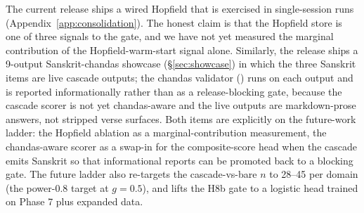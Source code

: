 The current release ships a wired Hopfield  that is exercised in single-session runs (Appendix~\ref{app:consolidation}). The honest claim is that the Hopfield store is one of three signals to the  gate, and we have not yet measured the marginal contribution of the Hopfield-warm-start signal alone. Similarly, the release ships a 9-output Sanskrit-chandas showcase (\S\ref{sec:showcase}) in which the three Sanskrit items are live cascade outputs; the chandas validator () runs on each output and is reported informationally rather than as a release-blocking gate, because the cascade scorer is not yet chandas-aware and the live outputs are markdown-prose answers, not stripped verse surfaces. Both items are explicitly on the future-work ladder: the Hopfield ablation as a marginal-contribution measurement, the chandas-aware scorer as a swap-in for the composite-score head when the cascade emits Sanskrit so that informational reports can be promoted back to a blocking gate. The future ladder also re-targets the cascade-vs-bare $n$ to 28--45 per domain (the power-0.8 target at $g=0.5$), and lifts the H8b gate to a logistic head trained on Phase 7 plus expanded data.
